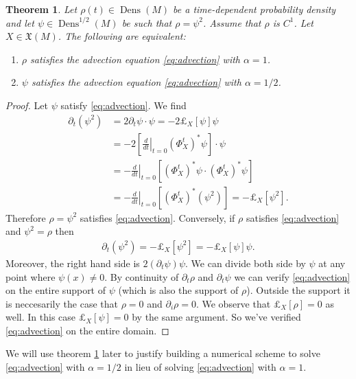 \documentclass[letterpaper, 12 pt]{amsart}
\newtheorem{thm}{Theorem}[section]
\DeclareMathOperator{\Dens}{Dens}
\begin{document}
  \begin{thm} \label{thm:advection}
    Let $\rho(t) \in \Dens(M)$ be a time-dependent probability density
    and let $\psi \in \Dens^{1/2}(M)$ be such that $\rho = \psi^2$.
    Assume that $\rho$ is $C^1$.
    Let $X \in \mathfrak{X}(M)$.
    The following are equivalent:
    \begin{enumerate}
      \item $\rho$ satisfies the advection equation \eqref{eq:advection} with $\alpha = 1$.
      \item $\psi$ satisfies the advection equation \eqref{eq:advection} with $\alpha = 1/2$.
    \end{enumerate}
  \end{thm}
  \begin{proof}
    Let $\psi$ satisfy \eqref{eq:advection}.
    We find
    \begin{align*}
      \partial_t (\psi^2) &= 2 \partial_t\psi \cdot \psi
      =-2 \pounds_X[\psi] \psi \\
      &= - 2 \left[ \left.\frac{d}{dt}\right|_{t=0}
         (\Phi_X^t)^* \psi \right] \cdot \psi \\
      &= - \left. \frac{d}{dt} \right|_{t=0}
        \left[ (\Phi_X^t)^* \psi \cdot (\Phi_X^t)^* \psi \right]\\
      &= - \left. \frac{d}{dt} \right|_{t=0}
        \left[ (\Phi_X^t)^* (\psi^2) \right] 
      = - \pounds_X[\psi^2].
    \end{align*}
    Therefore $\rho = \psi^2$ satisfies \eqref{eq:advection}.
    Conversely, if $\rho$ satisfies \eqref{eq:advection}
    and $\psi^2 = \rho$ then
    \begin{align*}
      \partial_t (\psi^2) = - \pounds_X[\psi^2] = - \pounds_X[\psi] \psi.
    \end{align*}
    Moreover, the right hand side is $2 (\partial_t \psi) \psi$.
    We can divide both side by $\psi$ at any point where $\psi(x) \neq 0$.
    By continuity of $\partial_t \rho$ and $\partial_t \psi$ we can
    verify \eqref{eq:advection} on the entire support of $\psi$
    (which is also the support of $\rho$).
    Outside the support it is neccesarily the case that
    $\rho = 0$ and  $\partial_i \rho = 0$.
    We observe that $\pounds_X[\rho] = 0$ as well.
    In this case $\pounds_X[\psi] = 0$ by the same argument.
    So we've verified \eqref{eq:advection} on the entire domain.
  \end{proof}

  We will use theorem \ref{thm:advection} later to justify building
  a numerical scheme to solve \eqref{eq:advection} with $\alpha = 1/2$
  in lieu of solving \eqref{eq:advection} with $\alpha = 1$.
\end{document}
